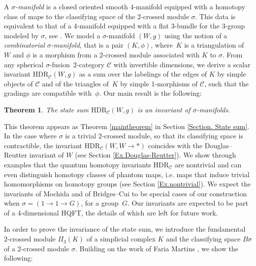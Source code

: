 \documentclass[a4paper, oneside]{amsart}
\numberwithin{equation}{subsection}
\theoremstyle{referencedlemma}
\theoremstyle{plain} %
\newtheorem*{theorem}{Theorem}
\theoremstyle{remark}
\begin{document}
A \emph{$\sigma$-manifold} is a closed oriented smooth 4-manifold equipped with a homotopy class of maps to the classifying space of the 2-crossed module $\sigma$.  This data is equivalent to that of a 4-manifold equipped with a flat 3-bundle for the 3-group modeled by $\sigma$, see \cite{faria_martins_fundamental_2011, jurco_nonabelian_2011, szabo_higher_2025, gagliardo_principal_2025, Cellot_thesis_2026}. We model a $\sigma$-manifold $(W,g)$ using the notion of a \emph{combinatorial $\sigma$-manifold}, that is a pair $(K,\phi)$, where~$K$ is a triangulation of $W$ and $\phi$ is a morphism from a 2-crossed module associated with $K$ to $\sigma$.  From any spherical $\sigma$-fusion~2-category $\mathcal{C}$ with invertible dimensions,  we derive a scalar invariant $\mathrm{HDR}_\mathcal{C}(W,g)$ as a sum over the labelings of the edges of $K$ by simple objects of $\mathcal{C}$ and of the triangles of~$K$ by simple 1-morphisms of $\mathcal{C}$, such that the gradings are compatible with~$\phi$. Our main result is the following:

\begin{theorem}
The state sum $\mathrm{HDR}_\mathcal{C}(W,g)$ is an invariant of $\sigma$-manifolds. 
\end{theorem}

This theorem appears as Theorem \ref{maintheorem} in Section \ref{Section. State sum}.  In the case where $\sigma$ is a trivial 2-crossed module,  so that its classifying space is contractible,  the invariant $\mathrm{HDR}_\mathcal{C}(W, W \to *)$ coincides with the Douglas--Reutter invariant of $W$ (see Section \ref{Ex.Douglas-Reutter}).  We show through examples that the quantum homotopy invariants $\mathrm{HDR}_\mathcal{C}$ are nontrivial and can even distinguish homotopy classes of phantom maps,  i.e. maps that induce trivial homomorphisms on homotopy groups (see Section \ref{Ex.nontrivial}).  We expect the invariants of Mochida \cite{mochidaInvariantsFlatConnections2026} and of Bridges--Cui \cite{bridges_involutory_2025} to be special cases of our construction when $\sigma = (1\to 1 \to G)$, for a group~$G$.  Our invariants are expected to be part of a 4-dimensional HQFT, the details of which are left for future work.

In order to prove the invariance of the state sum,  we introduce the fundamental 2-crossed module $\Pi_3(K)$ of a simplicial complex $K$ and the classifying space $B\sigma$ of a 2-crossed module $\sigma$.  Building on the work of Faria Martins \cite{martins_fundamental_2011},  we show the following:
\end{document}
